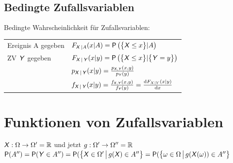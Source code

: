 \documentclass[german,color,6pt]{latex4ei/latex4ei_sheet}
\begin{document}
\begin{sectionbox}
	\subsection{Bedingte Zufallsvariablen}
	Bedingte Wahrscheinlichkeit für Zufallsvariablen:\\
	\begin{tabular}{ll}
		Ereignis A gegeben & $F_{\X|A}(x|A) = \P\left(\eset{\X \le x} | A\right)$\\
		ZV $\Y$ gegeben & $F_{\X|\Y}(x|y)= \P\left(\eset{\X \le x} | \eset{\Y = y}\right)$\\
		& $p_{\X|\Y}(x|y) = \frac{p_{\X,\Y}(x,y)}{p_{\Y}(y)}$\\
		& $f_{\X|\Y}(x|y) = \frac{f_{\X,\Y}(x,y)}{f_{\Y}(y)} = \frac{\diff F_{X|Y}(x|y)}{\diff x}$\\
	\end{tabular}

\end{sectionbox}

\section{Funktionen von Zufallsvariablen}
\begin{sectionbox}
	$\X: \Omega \ra \Omega' = \R$ und jetzt $g:\Omega' \ra \Omega'' = \R$\\
	$\P(A'') = \P(\Y \in A'') = \P(\iset{\X \in \Omega'}{g(\X) \in A''} = \P(\iset{\omega \in \Omega}{g(\X(\omega)) \in A''}$
\end{sectionbox}
\end{document}
